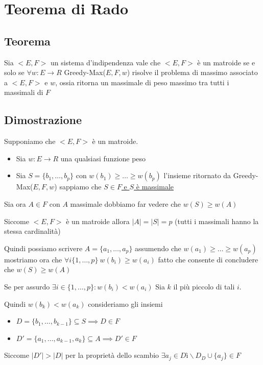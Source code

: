\chapter{Teorema di Rado}

\section{Teorema}

Sia $<E,F>$ un sistema d'indipendenza vale che $<E,F>$ è un matroide se e solo se $\forall w:E \to R$ Greedy-Max($E,F,w$) risolve il problema di massimo associato a $<E,F>$ e $w$, ossia ritorna un massimale di peso massimo tra tutti i massimali di $F$

\section{Dimostrazione}
Supponiamo che $<E,F>$ è un matroide.

\begin{itemize}
    \item Sia $w:E \to R$ una qualsiasi funzione peso
    \item Sia $S= \{b_1, \dots, b_p\}$ con $w(b_1) \geq \dots \geq w(b_p)$ l'insieme ritornato da Greedy-Max($E,F,w$) sappiamo che \uline{$S \in F$ e $S$ è massimale}
\end{itemize}

Sia ora $A \in F$ con $A$ massimale dobbiamo far vedere che $w(S) \geq w(A)$

Siccome $<E,F>$ è un matroide allora $|A|=|S|=p$ (tutti i massimali hanno la stessa cardinalità)

Quindi possiamo scrivere $A = \{a_1, \dots, a_p\}$ assumendo che $w(a_1) \geq \dots \geq w(a_p)$ mostriamo ora che $\forall i \{1 , \dots, p\}\ w(b_i) \geq w(a_i)$ fatto che consente di concludere che $w(S) \geq w(A)$

Se per assurdo $\exists i \in \{1 , \dots, p\} : w(b_i) < w(a_i)$ Sia $k$ il più piccolo di tali $i$.

Quindi $w(b_k) < w(a_k)$ consideriamo gli insiemi
\begin{itemize}
    \item $D = \{b_1, \dots, b_{k-1}\} \subseteq S \implies D \in F$
    \item $D' = \{a_1, \dots, a_{k-1},a_k\} \subseteq A \implies D' \in F$
\end{itemize}

Siccome $|D'| > |D|$ per la proprietà dello scambio $\exists a_j \in Dì \backslash D _ D \cup \{a_j\} \in F$

